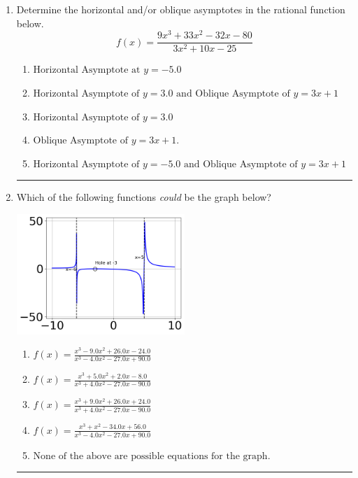 \documentclass[14pt]{extbook}
\newcommand{\litem}[1]{\item#1\hspace*{-1cm}\rule{\textwidth}{0.4pt}}
\begin{document}
\begin{enumerate}
{\begin{enumerate}[label=\Alph*.]
\end{enumerate} }
\litem{
Determine the horizontal and/or oblique asymptotes in the rational function below.\[ f(x) = \frac{9x^{3} +33 x^{2} -32 x -80}{3x^{2} +10 x -25} \]\begin{enumerate}[label=\Alph*.]
\item \( \text{Horizontal Asymptote at } y = -5.0 \)
\item \( \text{Horizontal Asymptote of } y = 3.0 \text{ and Oblique Asymptote of } y = 3x + 1 \)
\item \( \text{Horizontal Asymptote of } y = 3.0  \)
\item \( \text{Oblique Asymptote of } y = 3x + 1. \)
\item \( \text{Horizontal Asymptote of } y = -5.0 \text{ and Oblique Asymptote of } y = 3x + 1 \)

\end{enumerate} }
\litem{
Which of the following functions \textit{could} be the graph below?
\begin{center}
    \includegraphics[width=0.5\textwidth]{../Figures/identifyGraphOfRationalFunctionC.png}
\end{center}
\begin{enumerate}[label=\Alph*.]
\item \( f(x)=\frac{x^{3} -9.0 x^{2} +26.0 x -24.0}{x^{3} -4.0 x^{2} -27.0 x + 90.0} \)
\item \( f(x)=\frac{x^{3} +5.0 x^{2} +2.0 x -8.0}{x^{3} +4.0 x^{2} -27.0 x -90.0} \)
\item \( f(x)=\frac{x^{3} +9.0 x^{2} +26.0 x + 24.0}{x^{3} +4.0 x^{2} -27.0 x -90.0} \)
\item \( f(x)=\frac{x^{3} + x^{2} -34.0 x + 56.0}{x^{3} -4.0 x^{2} -27.0 x + 90.0} \)
\item \( \text{None of the above are possible equations for the graph.} \)


\end{enumerate}}
\end{enumerate}
\end{document}
